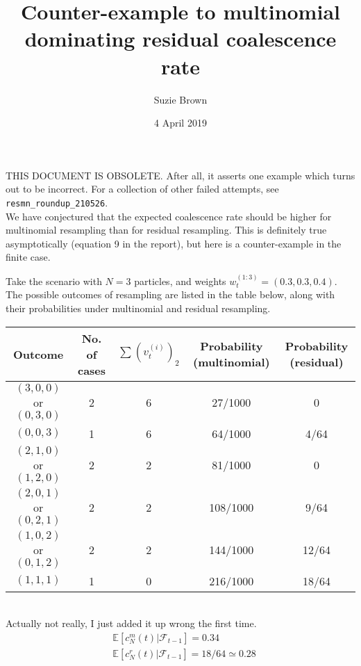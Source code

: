 \documentclass[fleqn]{article}
\title{Counter-example to multinomial dominating residual coalescence rate}
\author{Suzie Brown}
\date{4 April 2019}
\theoremstyle{definition}
\newcommand{\E}{\mathbb{E}}
\newcommand{\F}{\mathcal{F}_{t-1}}
\newcommand{\vt}[2][t]{v_{#1}^{(#2)}}
\newcommand{\wt}[2][t]{w_{#1}^{(#2)}}
\begin{document}
\maketitle
\thispagestyle{fancy}

{THIS DOCUMENT IS OBSOLETE. After all, it asserts one example which turns out to be incorrect. For a collection of other failed attempts, see \texttt{resmn\_roundup\_210526}. }\\

We have conjectured that the expected coalescence rate should be higher for multinomial resampling than for residual resampling. This is definitely true asymptotically (equation 9 in the report), but here is a counter-example in the finite case.

Take the scenario with $N=3$ particles, and weights $\wt{1:3} = (0.3, 0.3, 0.4)$.
The possible outcomes of resampling are listed in the table below, along with their probabilities under multinomial and residual resampling.\\

\begin{tabular}{c | c | c | c | c}
Outcome & No. of cases & $\sum (\vt{i})_2$ & Probability (multinomial) & Probability (residual) \\
\hline
$(3,0,0)$ or $(0,3,0)$ & 2 & 6 & 27/1000 & 0\\
$(0,0,3)$ & 1 & 6 & 64/1000 & 4/64 \\
$(2,1,0)$ or $(1,2,0)$ & 2 & 2 & 81/1000 & 0 \\
$(2,0,1)$ or $(0,2,1)$ & 2 & 2  & 108/1000 & 9/64 \\
$(1,0,2)$ or $(0,1,2)$ & 2 & 2 & 144/1000 & 12/64 \\
$(1,1,1)$ & 1 & 0 & 216/1000 & 18/64 \\
\end{tabular}\\

Actually not really, I just added it up wrong the first time.
\begin{align*}
& \E[c_N^m(t) |\F] = 0.34 \\
& \E[c_N^r(t) |\F] = 18/64 \simeq 0.28
\end{align*}
\end{document}
